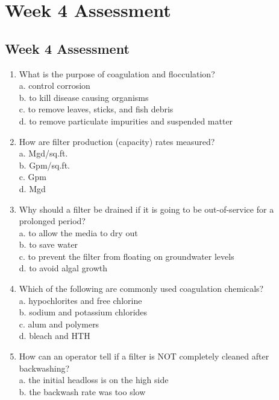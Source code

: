 
\chapter{Week 4 Assessment}
\section{Week 4 Assessment}
\begin{enumerate}[1.]
\item What is the purpose of coagulation and flocculation?\\
a. control corrosion\\
b. to kill disease causing organisms\\
c. to remove leaves, sticks, and fish debris\\
d. to remove particulate impurities and suspended matter\\
\item How are filter production (capacity) rates measured?\\
a. Mgd/sq.ft.\\
b. Gpm/sq.ft.\\
c. Gpm\\
d. Mgd\\
\item Why should a filter be drained if it is going to be out-of-service for a prolonged period?\\
a. to allow the media to dry out\\
b. to save water\\
c. to prevent the filter from floating on groundwater levels\\
d. to avoid algal growth\\
\item Which of the following are commonly used coagulation chemicals?\\
a. hypochlorites and free chlorine\\
b. sodium and potassium chlorides\\
c. alum and polymers\\
d. bleach and HTH\\
\item How can an operator tell if a filter is NOT completely cleaned after backwashing?\\
a. the initial headloss is on the high side\\
b. the backwash rate was too slow\\

\end{enumerate}
